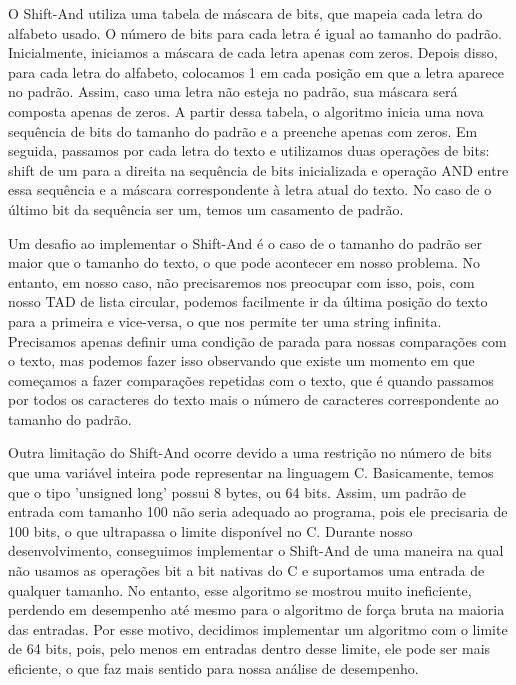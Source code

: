 \documentclass[12pt]{article}
\begin{document}
            O Shift-And utiliza uma tabela de máscara de bits, que mapeia cada letra do alfabeto usado. O número de bits para 
            cada letra é igual ao tamanho do padrão. Inicialmente, iniciamos a máscara de cada letra apenas com zeros. 
            Depois disso, para cada letra do alfabeto, colocamos 1 em cada posição em que a letra aparece no padrão. 
            Assim, caso uma letra não esteja no padrão, sua máscara será composta apenas de zeros. A partir dessa tabela, o 
            algoritmo inicia uma nova sequência de bits do tamanho do padrão e a preenche apenas com zeros. Em seguida, passamos 
            por cada letra do texto e utilizamos duas operações de bits: shift de um para a direita na sequência de bits inicializada 
            e operação AND entre essa sequência e a máscara correspondente à letra atual do texto. No caso de o último bit da 
            sequência ser um, temos um casamento de padrão.
            
            Um desafio ao implementar o Shift-And é o caso de o tamanho do padrão ser maior que o tamanho do texto, o que pode 
            acontecer em nosso problema. No entanto, em nosso caso, não precisaremos nos preocupar com isso, pois, com nosso TAD de 
            lista circular, podemos facilmente ir da última posição do texto para a primeira e vice-versa, o que nos permite ter 
            uma string infinita. Precisamos apenas definir uma condição de parada para nossas comparações com o texto, mas podemos 
            fazer isso observando que existe um momento em que começamos a fazer comparações repetidas com o texto, que é quando 
            passamos por todos os caracteres do texto mais o número de caracteres correspondente ao tamanho do padrão.
            
            Outra limitação do Shift-And ocorre devido a uma restrição no número de bits que uma variável inteira pode representar 
            na linguagem C. Basicamente, temos que o tipo 'unsigned long' possui 8 bytes, ou 64 bits. Assim, um padrão de entrada 
            com tamanho 100 não seria adequado ao programa, pois ele precisaria de 100 bits, o que ultrapassa o limite disponível no C. 
            Durante nosso desenvolvimento, conseguimos implementar o Shift-And de uma maneira na qual não usamos as operações 
            bit a bit nativas do C e suportamos uma entrada de qualquer tamanho. No entanto, esse algoritmo se mostrou muito ineficiente, 
            perdendo em desempenho até mesmo para o algoritmo de força bruta na maioria das entradas. Por esse motivo, decidimos 
            implementar um algoritmo com o limite de 64 bits, pois, pelo menos em entradas dentro desse limite, ele pode ser mais 
            eficiente, o que faz mais sentido para nossa análise de desempenho.
            
\end{document}
